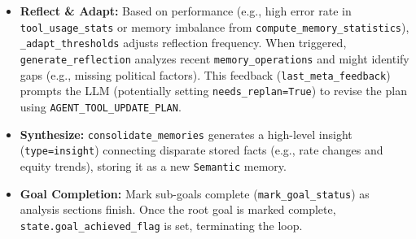 \documentclass[12pt,a4paper]{article}
\newcommand{\code}[1]{\nolinkurl{#1}}
\begin{document}
\begin{itemize}
\begin{itemize}
        \item \textbf{Reflect \& Adapt:} Based on performance (e.g., high error rate in \code{tool\_usage\_stats} or memory imbalance from \code{compute\_memory\_statistics}), \code{\_adapt\_thresholds} adjusts reflection frequency. When triggered, \code{generate\_reflection} analyzes recent \code{memory\_operations} and might identify gaps (e.g., missing political factors). This feedback (\code{last\_meta\_feedback}) prompts the LLM (potentially setting \code{needs\_replan=True}) to revise the plan using \code{AGENT\_TOOL\_UPDATE\_PLAN}.
        \item \textbf{Synthesize:} \code{consolidate\_memories} generates a high-level insight (\code{type=insight}) connecting disparate stored facts (e.g., rate changes and equity trends), storing it as a new \code{Semantic} memory.
        \item \textbf{Goal Completion:} Mark sub-goals complete (\code{mark\_goal\_status}) as analysis sections finish. Once the root goal is marked complete, \code{state.goal\_achieved\_flag} is set, terminating the loop.
    \end{itemize}


\end{itemize}
\end{document}
